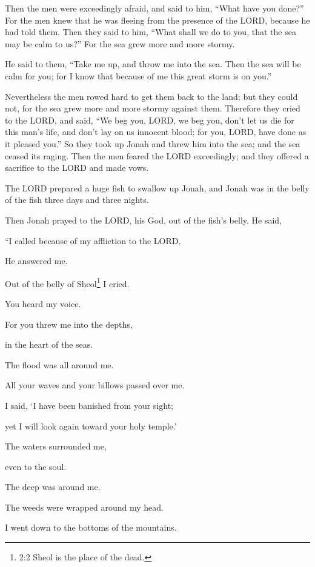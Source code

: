 \myverse{}Then the men were exceedingly afraid, and said to him, “What
have you done?” For the men knew that he was fleeing from the presence of the LORD, because he had told
them.
\myverse{}Then they said to him, “What shall we do to you, that the sea may be calm
to us?” For the sea grew more and more stormy.

\myverse{}He said to them, “Take me up, and throw me into the sea. Then
the sea will be calm for you; for I know that because of me this great storm is on you.”

\myverse{}Nevertheless the men rowed hard to get them back to the land;
but they could not, for the sea grew more and more stormy against them.
\myverse{}Therefore they cried to the LORD, and said, “We beg you, LORD, we beg you,
don’t let us die for this man’s life, and don’t lay on us innocent blood; for you, LORD, have done as
it pleased you.”
\myverse{}So they took up Jonah and threw him into the sea; and the sea ceased its raging.
\myverse{}Then the men feared the LORD exceedingly; and they offered a sacrifice to
the LORD and made vows.

\myverse{}The LORD prepared a huge fish to swallow up Jonah, and Jonah
was in the belly of the fish three days and three nights.


\mychapter{} \myverse*{}Then Jonah prayed to the LORD, his God, out of the fish’s belly.
\myverse{}He said,

“I called because of my affliction to the LORD.

He answered me.

Out of the belly of Sheol\footnote{2:2 Sheol is the place of the dead.} I cried.

You heard my voice.

\myverse{}For you threw me into the depths,

in the heart of the seas.

The flood was all around me.

All your waves and your billows passed over me.

\myverse{}I said, ‘I have been banished from your sight;

yet I will look again toward your holy temple.’

\myverse{}The waters surrounded me,

even to the soul.

The deep was around me.

The weeds were wrapped around my head.

\myverse{}I went down to the bottoms of the mountains.

